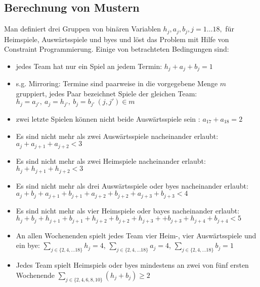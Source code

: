\subsection{Berechnung von Mustern}
\label{Phase2}
Man definiert drei Gruppen von binären Variablen $h_j, a_j, b_j, j=1\dots 18,$ für Heimspiele, Auswärtsspiele und byes und löst das Problem mit Hilfe von Constraint Programmierung. Einige von betrachteten Bedingungen sind:
\begin{itemize}
\setlength{\itemsep}{0pt}

\item jedes Team hat nur ein Spiel an jedem Termin: $h_j+a_j+b_j = 1$

\item s.g. Mirroring: Termine sind paarweise in die vorgegebene Menge $m$ gruppiert, jedes Paar bezeichnet Spiele der gleichen Team: $h_j=a_{j'},\ a_j=h_{j'},\ b_j=b_{j'}\ (j, j')\in m$

\item zwei letzte Spielen können nicht beide Auswärtsspiele sein : $a_{17}+a_{18} = 2$


\item Es sind nicht mehr als zwei Auswärtsspiele nacheinander erlaubt:\\ $a_j+a_{j+1}+a_{j+2}<3$ 

\item Es sind nicht mehr als zwei Heimspiele nacheinander erlaubt:\\ $h_{j}+h_{j+1}+h_{j+2}<3$ 

\item Es sind nicht mehr als drei Auswärtsspiele oder byes  nacheinander erlaubt: \\
$a_j+b_j+a_{j+1}+b_{j+1}+a_{j+2}+b_{j+2}+a_{j+3}+b_{j+3}<4$ 

\item Es sind nicht mehr als vier Heimspiele oder bayes nacheinander erlaubt:\\
$h_j+b_j+h_{j+1}+b_{j+1}+h_{j+2}+b_{j+2} +h_{j+3} ++b_{j+3} +h_{j+4}+b_{j+4} <5 $ 

\item An allen Wochenenden spielt jedes Team vier Heim-, vier Auswärtsspiele und ein bye:   $\sum_{j\in\{2,4,\dots 18\}}h_j = 4$, $\sum_{j\in\{2,4,\dots 18\}}a_j = 4$, $\sum_{j\in\{2,4,\dots 18\}}b_j = 1$

\item Jedes Team spielt Heimspiels oder byes mindestens an zwei von fünf ersten Wochenende $\sum_{j\in\{2,4,6,8,10\}}(h_j+b_j) \ge 2$

\end{itemize}

